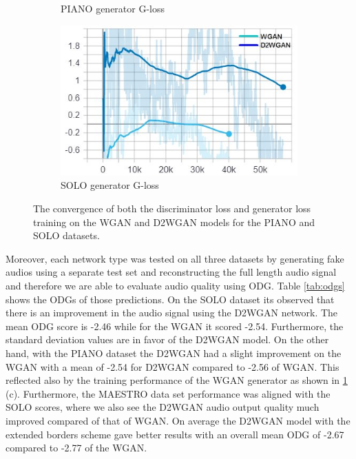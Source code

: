 \documentclass{article} %
\begin{document}
\begin{figure}[h!]
\begin{subfigure}[b]{0.45\linewidth}
    \caption{PIANO generator G-loss}
  \end{subfigure}
  \begin{subfigure}[b]{0.45\linewidth}
    \centering
    \includegraphics[width=\linewidth]{images/extendvsbasic52/vs_solo_gen_loss.jpg}
    \caption{SOLO generator G-loss}
  \end{subfigure}
  \caption{The convergence of both the discriminator loss and generator loss training on the WGAN and D2WGAN models for the PIANO and SOLO datasets.}
  \label{fig:entendvsbasic52}
\end{figure}

Moreover, each network type was tested on all three datasets by generating fake audios using a separate test set and reconstructing the full length audio signal and therefore we are able to evaluate audio quality using ODG. Table \ref{tab:odgs} shows the ODGs of those predictions. 
On the SOLO dataset its observed that there is an improvement in the audio signal using the D2WGAN network. The mean ODG score is -2.46 while for the WGAN it scored -2.54. Furthermore, the standard deviation values are in favor of the D2WGAN model. On the other hand, with the PIANO dataset the D2WGAN had a slight improvement on the WGAN with a mean of -2.54 for D2WGAN compared to -2.56 of WGAN. This reflected also by the training performance of the WGAN generator as shown in \ref{fig:entendvsbasic52} (c).
Furthermore, the MAESTRO data set performance was aligned with the SOLO scores, where we also see the D2WGAN audio output quality much improved compared of that of WGAN.
On average the D2WGAN model with the extended borders scheme gave better results with an overall mean ODG of -2.67 compared to -2.77 of the WGAN.

\end{document}
